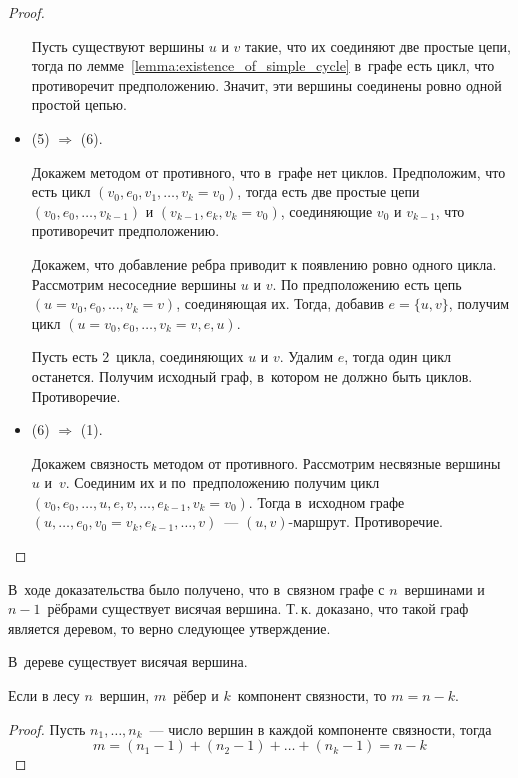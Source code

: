 \begin{proof}
\begin{itemize}
	Пусть существуют вершины $u$ и $v$ такие, что их соединяют две простые цепи, тогда по лемме~\ref{lemma:existence_of_simple_cycle} в~графе есть цикл, что противоречит предположению.
	Значит, эти вершины соединены ровно одной простой цепью.
	
	\item (5) $\Rightarrow$ (6).
	
	Докажем методом от противного, что в~графе нет циклов.
	Предположим, что есть цикл $(v_0, e_0, v_1, \ldots, v_k = v_0)$, тогда есть две простые цепи $(v_0, e_0, \ldots, v_{k-1})$ и $(v_{k-1}, e_k, v_k = v_0)$, соединяющие $v_0$ и $v_{k-1}$, что противоречит предположению.
	
	Докажем, что добавление ребра приводит к появлению ровно одного цикла.
	Рассмотрим несоседние вершины $u$ и $v$.
	По предположению есть цепь $(u = v_0, e_0, \ldots, v_k = v)$, соединяющая их.
	Тогда, добавив $e = \{ u, v \}$, получим цикл $(u = v_0, e_0, \ldots, v_k = v, e, u)$.
	
	Пусть есть $2$~цикла, соединяющих $u$ и $v$.
	Удалим $e$, тогда один цикл останется.
	Получим исходный граф, в~котором не должно быть циклов.
	Противоречие.
	
	\item (6) $\Rightarrow$ (1).
	
	Докажем связность методом от противного.
	Рассмотрим несвязные вершины $u$ и~$v$.
	Соединим их и по~предположению получим цикл $(v_0, e_0, \ldots, u, e, v, \ldots, e_{k-1}, v_k = v_0)$.
	Тогда в~исходном графе $(u, \ldots, e_0, v_0 = v_k, \allowbreak e_{k-1}, \ldots, v)$~--- $(u, v)$-маршрут.
	Противоречие.
\end{itemize}
\end{proof}

В~ходе доказательства было получено, что в~связном графе с $n$~вершинами и $n - 1$~рёбрами существует висячая вершина.
Т.\,к. доказано, что такой граф является деревом, то верно следующее утверждение.
\begin{statement}
В~дереве существует висячая вершина.
\end{statement}

\begin{statement}
Если в лесу $n$~вершин, $m$~рёбер и $k$~компонент связности, то $m = n - k$.
\end{statement}
\begin{proof}
Пусть $n_1, \ldots, n_k$~--- число вершин в каждой компоненте связности, тогда
\begin{equation*}
m = (n_1 - 1) + (n_2 - 1) + \ldots + (n_k - 1) = n - k
\end{equation*}
\end{proof}

